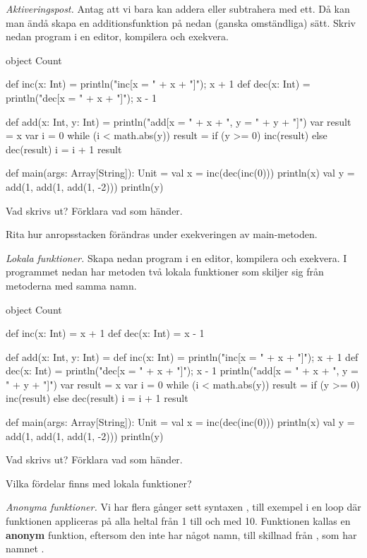 \Task \emph{Aktiveringspost.} Antag att vi bara kan addera eller subtrahera med ett. Då kan man ändå skapa en additionsfunktion på nedan (ganska omständliga) sätt. Skriv nedan program i en editor, kompilera och exekvera. 
\begin{Code}
object Count {
  def inc(x: Int) = {println("inc[x = " + x + "]"); x + 1}
  def dec(x: Int) = {println("dec[x = " + x + "]"); x - 1}

  def add(x: Int, y: Int) = {
    println("add[x = " + x + ", y = " + y + "]")
    var result = x 
    var i = 0 
    while (i < math.abs(y)){
      result = if (y >= 0) inc(result) else dec(result)
      i = i + 1
    }
    result
  }

  def main(args: Array[String]): Unit = {
    val x =  inc(dec(inc(0)))
    println(x)
    val y = add(1, add(1, add(1, -2)))
    println(y)
  }
}
\end{Code}

\Subtask Vad skrivs ut? Förklara vad som händer.

\Subtask\Pen Rita hur anropsstacken förändras under exekveringen av main-metoden.


\Task \emph{Lokala funktioner.} Skapa nedan program i en editor, kompilera och exekvera. I programmet nedan har metoden  två lokala funktioner som skiljer sig från metoderna med samma namn. 
\begin{Code}
object Count {
  def inc(x: Int) = x + 1
  def dec(x: Int) = x - 1

  def add(x: Int, y: Int) = {
    def inc(x: Int) = {println("inc[x = " + x + "]"); x + 1}
    def dec(x: Int) = {println("dec[x = " + x + "]"); x - 1}
    println("add[x = " + x + ", y = " + y + "]")
    var result = x 
    var i = 0 
    while (i < math.abs(y)){
      result = if (y >= 0) inc(result) else dec(result)
      i = i + 1
    }
    result
  }

  def main(args: Array[String]): Unit = {
    val x =  inc(dec(inc(0)))
    println(x)
    val y = add(1, add(1, add(1, -2)))
    println(y)
  }
}
\end{Code}

\Subtask Vad skrivs ut? Förklara vad som händer.

\Subtask\Pen Vilka fördelar finns med lokala funktioner?


\Task \emph{Anonyma funktioner.} Vi har flera gånger sett syntaxen , till exempel i en loop  där funktionen  appliceras på alla heltal från 1 till och med 10. Funktionen  kallas en \textbf{anonym} funktion, eftersom den inte har något namn, till skillnad från , som har namnet . 

